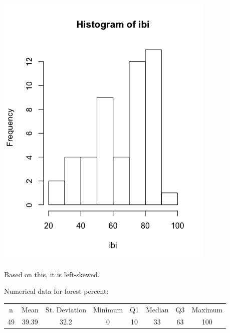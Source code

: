 \documentclass[11pt]{article}
\begin{document}
		\begin{center}
			\includegraphics[scale=0.5]{images/ibihist.png}
		\end{center}\par
		Based on this, it is left-skewed.\par
		
		Numerical data for forest percent:\par
		
		\begin{center}
		\begin{tabular}{cccccccc}
			n & Mean & St. Deviation & Minimum & Q1 & Median & Q3 & Maximum\\
			49 & 39.39 & 32.2 & 0 & 10 & 33 & 63 & 100\\
		\end{tabular}\par
		\end{center}
\end{document}
